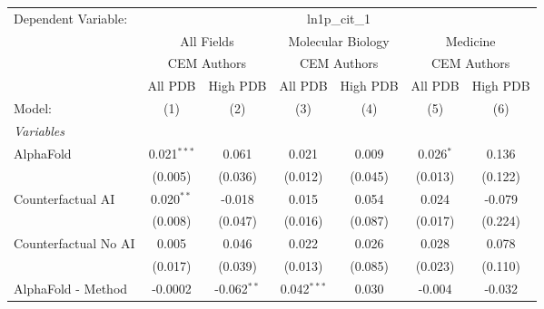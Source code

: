 \begingroup
\centering
\begin{tabular}{lcccccc}
   \tabularnewline \midrule \midrule
   Dependent Variable: & \multicolumn{6}{c}{ln1p\_cit\_1}\\
 & \multicolumn{2}{c}{All Fields} & \multicolumn{2}{c}{Molecular Biology} & \multicolumn{2}{c}{Medicine} \\
\cmidrule(lr){2-3} \cmidrule(lr){4-5} \cmidrule(lr){6-7}
 & \multicolumn{2}{c}{CEM Authors} & \multicolumn{2}{c}{CEM Authors} & \multicolumn{2}{c}{CEM Authors} \\
\cmidrule(lr){2-3} \cmidrule(lr){4-5} \cmidrule(lr){6-7}
 & \multicolumn{1}{c}{All PDB} & \multicolumn{1}{c}{High PDB} & \multicolumn{1}{c}{All PDB} & \multicolumn{1}{c}{High PDB} & \multicolumn{1}{c}{All PDB} & \multicolumn{1}{c}{High PDB} \\
\cmidrule(lr){2-2} \cmidrule(lr){3-3} \cmidrule(lr){4-4} \cmidrule(lr){5-5} \cmidrule(lr){6-6} \cmidrule(lr){7-7}
   Model:                                                     & (1)            & (2)           & (3)           & (4)          & (5)            & (6)\\  
   \midrule
   \emph{Variables}\\
   AlphaFold                                                  & 0.021$^{***}$  & 0.061         & 0.021         & 0.009        & 0.026$^{*}$    & 0.136\\   
                                                              & (0.005)        & (0.036)       & (0.012)       & (0.045)      & (0.013)        & (0.122)\\   
   Counterfactual AI                                          & 0.020$^{**}$   & -0.018        & 0.015         & 0.054        & 0.024          & -0.079\\   
                                                              & (0.008)        & (0.047)       & (0.016)       & (0.087)      & (0.017)        & (0.224)\\   
   Counterfactual No AI                                       & 0.005          & 0.046         & 0.022         & 0.026        & 0.028          & 0.078\\   
                                                              & (0.017)        & (0.039)       & (0.013)       & (0.085)      & (0.023)        & (0.110)\\   
   AlphaFold - Method                                         & -0.0002        & -0.062$^{**}$ & 0.042$^{***}$ & 0.030        & -0.004         & -0.032\\   

\end{tabular}
